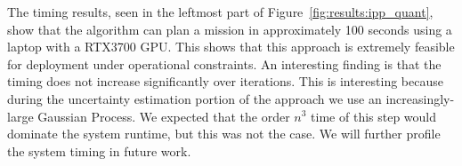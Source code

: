 The timing results, seen in the leftmost part of Figure~\ref{fig:results:ipp_quant}, show that the algorithm can plan a mission in approximately 100 seconds using a laptop with a RTX3700 GPU. This shows that this approach is extremely feasible for deployment under operational constraints. An interesting finding is that the timing does not increase significantly over iterations. This is interesting because during the uncertainty estimation portion of the approach we use an increasingly-large Gaussian Process. We expected that the order $n^3$ time of this step would dominate the system runtime, but this was not the case. We will further profile the system timing in future work.


